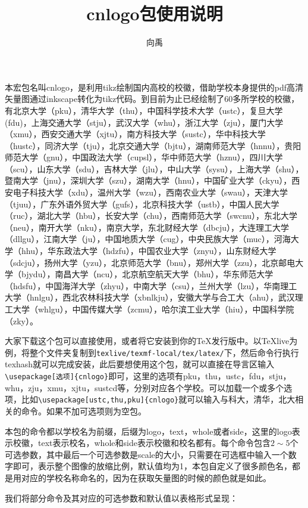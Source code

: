 \documentclass{ctexart}
\title{cnlogo包使用说明}\author{向禹}
\begin{document}
\maketitle
本宏包名叫cnlogo，是利用tikz绘制国内高校的校徽，借助学校本身提供的pdf高清矢量图通过inkscape转化为tikz代码。到目前为止已经绘制了60多所学校的校徽，有北京大学（pku），清华大学（thu），中国科学技术大学（ustc），复旦大学(fdu)，上海交通大学（stju），武汉大学（whu），浙江大学（zju），厦门大学（xmu），西安交通大学（xjtu），南方科技大学（sustc），华中科技大学（hustc），同济大学（tju），北京交通大学（bjtu），湖南师范大学（hnnu），贵阳师范大学（gnu），中国政法大学（cupsl），华中师范大学（hznu），四川大学（scu），山东大学（sdu），吉林大学（jlu），中山大学（sysu），上海大学（shu），暨南大学（jnu），深圳大学（szu），湖南大学（hnu），中国矿业大学（ckyu），西安电子科技大学（xdu），温州大学（wzu），西南农业大学（swau），天津大学（tjuu），广东外语外贸大学（gufs），北京科技大学（ustb），中国人民大学（ruc），湖北大学（hbu），长安大学（chu），西南师范大学（swcnu），东北大学（neu），南开大学（nku），南京大学，东北财经大学（dbcju），大连理工大学（dllgu），江南大学（ju），中国地质大学（cug），中央民族大学（muc），河海大学（hhu），华东政法大学（hdzfu），中国农业大学（znyu），山东财经大学（sdcju），扬州大学（yzu），北京师范大学（bnu），郑州大学（zzu），北京邮电大学（bjydu），南昌大学（ncu），北京航空航天大学（bhu），华东师范大学（hdsfu），中国海洋大学（zhyu），中南大学（csu），兰州大学（lzu），华南理工大学（hnlgu），西北农林科技大学（xbnlkju），安徽大学与合工大（ahu），武汉理工大学（whlgu），中国传媒大学（zcmu），哈尔滨工业大学（hiu），中国科学院（zky）。


大家下载这个包可以直接使用，或者将它安装到你的\TeX 发行版中。以\TeX live为例，将整个文件夹复制到\texttt{texlive/texmf-local/tex/latex/}下，然后命令行执行texhash就可以完成安装，此后要想使用这个包，就可以直接在导言区输入\verb|\usepackage[选项]{cnlogo}|即可，这里的选项有pku，thu，ustc，fdu，stju，whu，zju，xmu，xjtu，sustcd等，分别对应各个学校。可以加载一个或多个选项，比如\verb|\usepackage[ustc,thu,pku]{cnlogo}|就可以输入与科大，清华，北大相关的命令。如果不加可选项则为空包。

本包的命令都以学校名为前缀，后缀为logo，text，whole或者side，这里的logo表示校徽，text表示校名，whole和side表示校徽和校名都有。每个命令包含$2\sim5$个可选参数，其中最后一个可选参数是scale的大小，只需要在可选框中输入一个数字即可，表示整个图像的放缩比例，默认值均为1，本包自定义了很多颜色名，都是用对应的学校名称命名的，因为在获取矢量图的时候的颜色就是如此。

我们将部分命令及其对应的可选参数和默认值以表格形式呈现：
\end{document}
